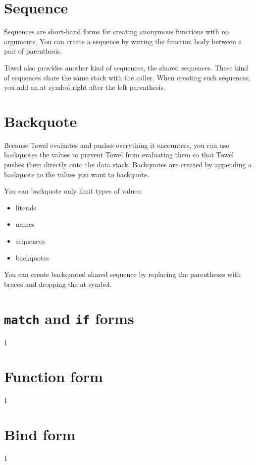 \documentclass{book}
\begin{document}
\section{Sequence}

Sequences are short-hand forms for creating anonymous functions with no arguments. You can create a sequence by writing the function body between a pair of parenthesis.

Towel also provides another kind of sequences, the shared sequences. These kind of sequences share the same stack with the caller. When creating such sequences, you add an at symbol right after the left parenthesis.

\section{Backquote}

Because Towel evaluates and pushes everything it encounters, you can use backquotes the values to prevent Towel from evaluating them so that Towel pushes them directly onto the data stack. Backquotes are created by appending a backquote to the values you want to backquote.

You can backquote only limit types of values:
\begin{itemize}
\item literals
\item names
\item sequences
\item backquotes
\end{itemize}

You can create backquoted shared sequence by replacing the parentheses with braces and dropping the at symbol.

\section{\texttt{match} and \texttt{if} forms}

1

\section{Function form}

1

\section{Bind form}

1
\end{document}
